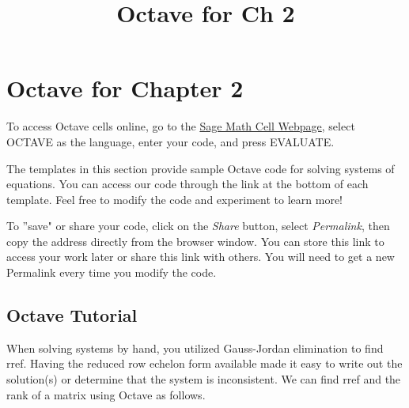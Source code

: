 \documentclass{ximera}
\title{Octave for Ch 2} \license{CC BY-NC-SA 4.0}
\begin{document}
\begin{abstract}
\end{abstract}
\maketitle

\section*{Octave for Chapter 2}

To access Octave cells online, go to the \href{https://sagecell.sagemath.org/}{Sage Math Cell Webpage}, select OCTAVE as the language, enter your code, and press EVALUATE.  

The templates in this section provide sample Octave code for solving systems of equations. You can access our code through the link at the bottom of each template.  Feel free to modify the code and experiment to learn more!  

To ''save" or share your code, click on the \emph{Share} button, select \emph{Permalink}, then copy the address directly from the browser window.  You can store this link to access your work later or share this link with others.  You will need to get a new Permalink every time you modify the code.


\subsection*{Octave Tutorial}

When solving systems by hand, you utilized Gauss-Jordan elimination to find rref.  Having the reduced row echelon form available made it easy to write out the solution(s) or determine that the system is inconsistent.  We can find rref and the rank of a matrix using Octave as follows.
\end{document}
